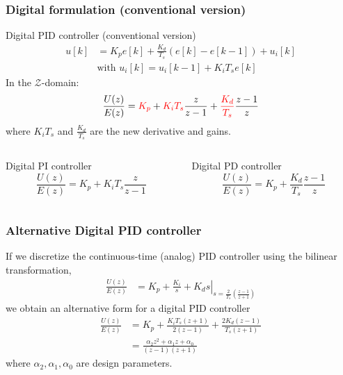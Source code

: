 \begin{frame}
	\frametitle{Digital formulation (conventional version)}
	\vspace{-1em}
	\small{
	\begin{block}{Digital PID controller (conventional version)}
			\vspace{-1em}
			\begin{align*}
			u[k] &= K_p e[k] + \frac{K_d}{T_s}(e[k] - e[k-1])+u_i[k] \\
			&\text{with } u_i[k] = u_i[k-1] + K_i T_s e[k]
			\end{align*}	
			In the $\mathcal{Z}$-domain:
			\begin{equation*}
			\frac{U(z)}{E(z)} = \textcolor{red}{K_p}  + \textcolor{red}{K_i T_s}\frac{z}{z-1} + \textcolor{red}{\frac{K_d}{T_s}}\frac{z-1}{z}
			\end{equation*}
			where $K_iT_s$ and $\frac{K_d}{T_s}$ are the new derivative and gains.
	\end{block}
	\begin{columns}
		\begin{column}{0.5 \textwidth}
			\begin{block}{Digital PI controller}
				$$\frac{U(z)}{E(z)} = K_p + K_i T_s \frac{z}{z-1} $$
			\end{block}
		\end{column}
		\begin{column}{0.5 \textwidth}
			\begin{block}{Digital PD controller}
				$$\frac{U(z)}{E(z)} = K_p + \frac{K_d}{T_s}\frac{z-1}{z} $$
			\end{block}
		\end{column}
	\end{columns}}
\end{frame}

\begin{frame}
	\frametitle{Alternative Digital PID controller}
	If we discretize the continuous-time (analog) PID controller using the bilinear transformation,
	\begin{align*}
	\frac{U(z)}{E(z)} &= \left. K_p + \frac{K_i}{s} + K_d s \right|_ {s=\frac{2}{T_s}\left( \frac{z-1}{z+1}\right)}
	\end{align*}
	we obtain an alternative form for a digital PID controller
	\begin{align*}
		\frac{U(z)}{E(z)} &= K_p + \frac{K_iT_s(z + 1)}{2(z-1)} + \frac{2K_d(z-1)}{T_s(z+1)} \\
		&= \frac{\alpha_2 z^2 + \alpha_1 z + \alpha_0}{(z-1)(z+1)}
	\end{align*}
	where $\alpha_2, \alpha_1, \alpha_0$ are design parameters.
\end{frame}

